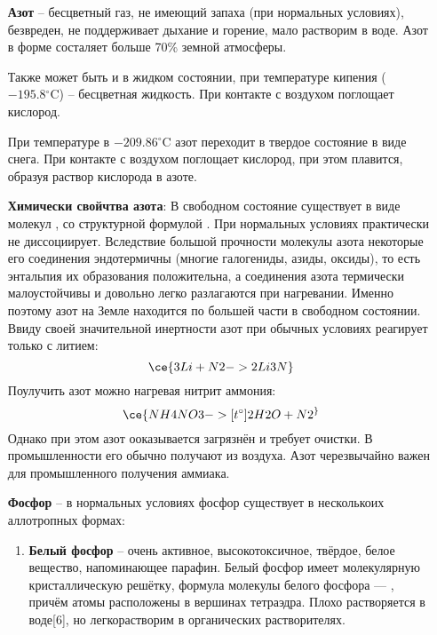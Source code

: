 \begin{itemize}
    \item[\textbf{Азот}] -- бесцветный газ, не имеющий запаха  (при нормальных условиях), безвреден, не поддерживает дыхание и горение, мало растворим в воде. Азот в форме  состаляет больше 70\% земной атмосферы.

    Также может быть и в жидком состоянии, при температуре кипения ($−195.8 {}^{\circ}\mathrm{C}$) -- бесцветная жидкость. При контакте с воздухом поглощает кислород.

    При температуре в $−209.86 {}^{\circ}\mathrm{C}$ азот переходит в твердое состояние в виде снега. При контакте с воздухом поглощает кислород, при этом плавится, образуя раствор кислорода в азоте.
    
    \textbf{Химически свойчтва азота}:
    В свободном состояние существует в виде молекул , со структурной формулой . При нормальных условиях практически не диссоциирует. Вследствие большой прочности молекулы азота некоторые его соединения эндотермичны (многие галогениды, азиды, оксиды), то есть энтальпия их образования положительна, а соединения азота термически малоустойчивы и довольно легко разлагаются при нагревании. Именно поэтому азот на Земле находится по большей части в свободном состоянии. Ввиду своей значительной инертности азот при обычных условиях реагирует только с литием:
    \begin{equation*}
        \ce{3Li + N2 -> 2Li3N}  
    \end{equation*}
    Поулучить азот можно нагревая нитрит аммония:
    \begin{equation*}
        \ce{NH4NO3 ->[t^{\circ}] 2H2O + N2 ^} 
    \end{equation*}
    Однако при этом азот ооказывается загрязнён и требует очистки. В промышленности его обычно получают из воздуха. Азот черезвычайно важен для промышленного получения аммиака.
    \item[\textbf{Фосфор}] -- в нормальных условиях фосфор существует в несколькоих аллотропных формах:
    \begin{enumerate}
        \item \textbf{Белый фосфор} -- очень активное, высокотоксичное, твёрдое, белое вещество, напоминающее парафин. Белый фосфор имеет молекулярную кристаллическую решётку, формула молекулы белого фосфора — , причём атомы расположены в вершинах тетраэдра. Плохо растворяется в воде[6], но легкорастворим в органических растворителях.
        

\end{enumerate}
\end{itemize}
